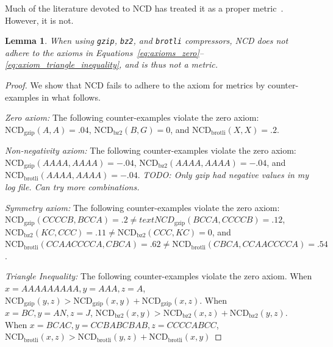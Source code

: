 \documentclass[preprint,12pt]{article}
\newcommand{\cm}[1]{\textit{{\color{blue}#1}}}
\newtheorem{lemma}{Lemma}
\begin{document}
Much of the literature devoted to NCD has treated it as a proper metric~\cite{opitz2023gzip,weinreich2023parameter,nishida2011tweet,jiang2022less}. However, it is not.
\begin{lemma}
    When using \texttt{gzip}, \texttt{bz2}, and \texttt{brotli} compressors, NCD does not adhere to the axioms in Equations~\ref{eq:axioms_zero}--\ref{eq:axiom_triangle_inequality}, and is thus not a metric.
\end{lemma}
\begin{proof}
    We show that NCD fails to adhere to the axiom for metrics by counter-examples in what follows.

    \vspace{0.5em}
    \noindent%
    \textit{Zero axiom:} The following counter-examples violate the zero axiom:
    $\text{NCD}_{\text{gzip}}(A,A) = .04$, $\text{NCD}_{\text{bz2}}(B,G) = 0 $, and $\text{NCD}_{\text{brotli}}(X,X) = .2$.

    \vspace{0.5em}
    \noindent%
    \textit{Non-negativity axiom:} The following counter-examples violate the zero axiom:
    $\text{NCD}_{\text{gzip}}(AAAA,AAAA) = -.04$, $\text{NCD}_{\text{bz2}}(AAAA,AAAA) = -.04$, and $\text{NCD}_{\text{brotli}}(AAAA,AAAA) = -.04$.
    \cm{TODO: Only gzip had negative values in my log file. Can try more combinations.}
    
    \vspace{0.5em}
    \noindent%
    \textit{Symmetry axiom:} The following counter-examples violate the zero axiom:
    $\text{NCD}_{\text{gzip}}(CCCCB, BCCA) = .2 \neq text{NCD}_{\text{gzip}}(BCCA, CCCCB)=.12$, $\text{NCD}_{\text{bz2}}(KC, CCC) = .11 \neq \text{NCD}_{\text{bz2}}(CCC, KC) = 0 $, and $\text{NCD}_{\text{brotli}}(CCAACCCCA, CBCA) = .62 \neq \text{NCD}_{\text{brotli}}(CBCA, CCAACCCCA) = .54$.

    \vspace{0.5em}
    \noindent%
    \textit{Triangle Inequality:} The following counter-examples violate the zero axiom. When $x= AAAAAAAAA, y=AAA, z=A$, $\text{NCD}_{\text{gzip}}(y,z) > \text{NCD}_{\text{gzip}}(x,y) + \text{NCD}_{\text{gzip}}(x,z)$. When $x= BC, y=AN, z=J$, $\text{NCD}_{\text{bz2}}(x,y) > \text{NCD}_{\text{bz2}}(x,z) + \text{NCD}_{\text{bz2}}(y,z)$. When $x= BCAC, y=CCBABCBAB, z=CCCCABCC$, $\text{NCD}_{\text{brotli}}(x,z) > \text{NCD}_{\text{brotli}}(y,z) + \text{NCD}_{\text{brotli}}(x,y)$
    
\end{proof}
\end{document}
